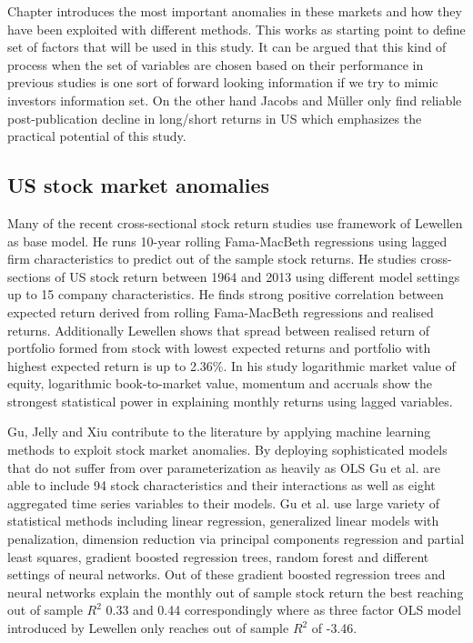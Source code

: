 \documentclass{article}
\begin{document}
Chapter introduces the most important anomalies in these markets and how they have been exploited with different methods. This works as starting point to define set of factors that will be used in this study. It can be argued that this kind of process when the set of variables are chosen based on their performance in previous studies is one sort of forward looking information if we try to mimic investors information set. On the other hand Jacobs and Müller \citeyear{JACOBS2020213} only find reliable post-publication decline in long/short returns in US which emphasizes the practical potential of this study.

\subsection{US stock market anomalies}\label{USStockMarketAnomalies}
Many of the recent cross-sectional stock return studies use framework of Lewellen \citeyear{lewellen2015} as base model. He runs 10-year rolling Fama-MacBeth regressions using lagged firm characteristics to predict out of the sample stock returns. He studies cross-sections of US stock return between 1964 and 2013 using different model settings up to 15 company characteristics. He finds strong positive correlation between expected return derived from rolling Fama-MacBeth regressions and realised returns. Additionally Lewellen shows that spread between realised return of portfolio formed from stock with lowest expected returns and portfolio with highest expected return is up to 2.36\%. In his study logarithmic market value of equity, logarithmic book-to-market value, momentum and accruals show the strongest statistical power in explaining monthly returns using lagged variables.

Gu, Jelly and Xiu \citeyear{guetal} contribute to the literature by applying machine learning methods to exploit stock market anomalies. By deploying sophisticated models that do not suffer from over parameterization as heavily as OLS Gu et al. are able to include 94 stock characteristics and their interactions as well as eight aggregated time series variables to their models. Gu et al. use large variety of statistical methods including linear regression, generalized linear models with penalization, dimension reduction via principal components regression and partial least squares, gradient boosted regression trees, random forest and different settings of neural networks. Out of these gradient boosted regression trees and neural networks \footnotemark explain the monthly out of sample stock return the best reaching out of sample $R^{2}$ 0.33 and 0.44 correspondingly where as three factor OLS model introduced by Lewellen \citeyear{lewellen2015} only reaches out of sample $R^{2}$ of -3.46. 
\end{document}
